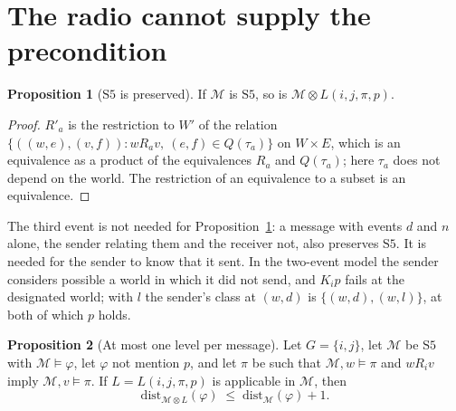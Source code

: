 \documentclass[11pt,a4paper]{article}
\theoremstyle{definition}
\newtheorem{proposition}{Proposition}
\newcommand{\Mod}{\mathcal{M}}
\newcommand{\prd}{\otimes}
\newcommand{\Kop}[1]{K_{#1}}
\newcommand{\dist}{\mathrm{dist}}
\begin{document}
\section{The radio cannot supply the precondition}
\label{sec:radio}

\begin{proposition}[$\mathrm{S5}$ is preserved]
\label{prop:s5}
If $\Mod$ is $\mathrm{S5}$, so is $\Mod \prd L(i,j,\pi,p)$.
\end{proposition}

\begin{proof}
$R'_a$ is the restriction to $W'$ of the relation
$\{((w,e),(v,f)) : w R_a v,\ (e,f) \in Q(\tau_a)\}$ on $W \times E$, which is an
equivalence as a product of the equivalences $R_a$ and $Q(\tau_a)$; here
$\tau_a$ does not depend on the world. The restriction of an equivalence to a
subset is an equivalence.
\end{proof}

\noindent
The third event is not needed for Proposition~\ref{prop:s5}: a message with
events $d$ and $n$ alone, the sender relating them and the receiver not, also
preserves $\mathrm{S5}$. It is needed for the sender to know that it sent. In
the two-event model the sender considers possible a world in which it did not
send, and $\Kop{i}p$ fails at the designated world; with $l$ the sender's class
at $(w,d)$ is $\{(w,d),(w,l)\}$, at both of which $p$ holds.

\begin{proposition}[At most one level per message]
\label{prop:onelevel}
Let $G = \{i,j\}$, let $\Mod$ be $\mathrm{S5}$ with $\Mod \models \varphi$, let
$\varphi$ not mention $p$, and let $\pi$ be such that
$\Mod, w \models \pi$ and $w R_i v$ imply $\Mod, v \models \pi$. If
$L = L(i,j,\pi,p)$ is applicable in $\Mod$, then
\[
  \dist_{\Mod \prd L}(\varphi) \;\leq\; \dist_\Mod(\varphi) + 1 .
\]
\end{proposition}
\end{document}
